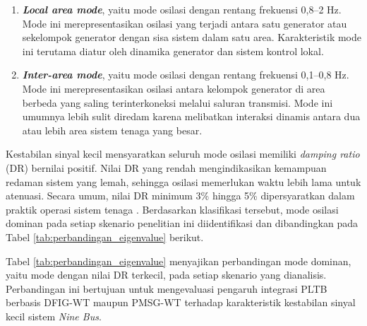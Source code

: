 \begin{enumerate}
	\item \textbf{\textit{Local area mode}}, yaitu mode osilasi dengan rentang
	frekuensi 0,8--2 Hz. Mode ini merepresentasikan osilasi yang terjadi antara
	satu generator atau sekelompok generator dengan sisa sistem dalam satu area.
	Karakteristik mode ini terutama diatur oleh dinamika generator dan sistem
	kontrol lokal.
	\item \textbf{\textit{Inter-area mode}}, yaitu mode osilasi dengan rentang
	frekuensi 0,1--0,8 Hz. Mode ini merepresentasikan osilasi antara kelompok
	generator di area berbeda yang saling terinterkoneksi melalui saluran
	transmisi. Mode ini umumnya lebih sulit diredam karena melibatkan interaksi
	dinamis antara dua atau lebih area sistem tenaga yang besar.
\end{enumerate}

Kestabilan sinyal kecil mensyaratkan seluruh mode osilasi memiliki
\textit{damping ratio} (DR) bernilai positif. Nilai DR yang rendah
mengindikasikan kemampuan redaman sistem yang lemah, sehingga osilasi memerlukan
waktu lebih lama untuk atenuasi. Secara umum, nilai DR minimum 3\% hingga 5\%
dipersyaratkan dalam praktik operasi sistem tenaga \cite{mehta2014}. Berdasarkan
klasifikasi tersebut, mode osilasi dominan pada setiap skenario penelitian ini
diidentifikasi dan dibandingkan pada Tabel \ref{tab:perbandingan_eigenvalue}
berikut.

Tabel \ref{tab:perbandingan_eigenvalue} menyajikan perbandingan mode dominan,
yaitu mode dengan nilai DR terkecil, pada setiap skenario yang dianalisis.
Perbandingan ini bertujuan untuk mengevaluasi pengaruh integrasi PLTB berbasis
DFIG-WT maupun PMSG-WT terhadap karakteristik kestabilan sinyal kecil sistem
\textit{Nine Bus}.

